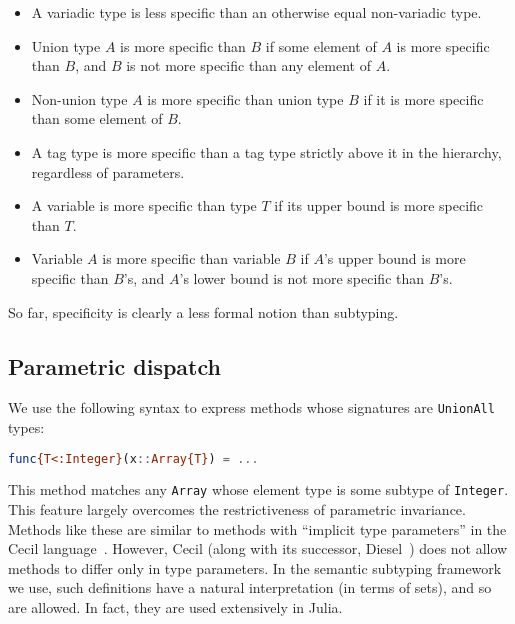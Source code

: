 \begin{itemize}
\item A variadic type is less specific than an otherwise equal non-variadic type.
\item Union type $A$ is more specific than $B$ if some element of $A$ is
more specific than $B$, and $B$ is not more specific than any
element of $A$.
\item Non-union type $A$ is more specific than union type $B$ if it is more specific
than some element of $B$.
\item A tag type is more specific than a tag type strictly above it in the
hierarchy, regardless of parameters.
\item A variable is more specific than type $T$ if its upper bound is more specific
than $T$.
\item Variable $A$ is more specific than variable $B$ if $A$'s upper bound is
more specific than $B$'s, and $A$'s lower bound is not more specific than $B$'s.
\end{itemize}

So far, specificity is clearly a less formal notion than subtyping.

\subsection{Parametric dispatch}

We use the following syntax to express methods whose signatures
are \texttt{UnionAll} types:

\begin{singlespace}
\begin{lstlisting}[language=julia]
func{T<:Integer}(x::Array{T}) = ...
\end{lstlisting}
\end{singlespace}

\noindent
This method matches any \texttt{Array} whose element type is some subtype
of \texttt{Integer}.
This feature largely overcomes the restrictiveness of parametric invariance.
Methods like these are similar to methods with ``implicit type parameters''
in the Cecil language~\cite{cecilspec}.
However, Cecil (along with its successor, Diesel~\cite{chambers2006diesel})
does not allow methods to differ only in type parameters.
In the semantic subtyping framework we use, such definitions have a
natural interpretation (in terms of sets), and so are allowed.
In fact, they are used extensively in Julia.

